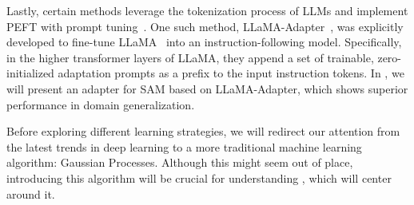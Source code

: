 Lastly, certain methods leverage the tokenization process of LLMs and implement PEFT with prompt tuning~. One such method, LLaMA-Adapter~, was explicitly developed to fine-tune LLaMA~ into an instruction-following model. Specifically, in the higher transformer layers of LLaMA, they append a set of trainable, zero-initialized adaptation prompts as a prefix to the input instruction tokens. In , we will present an adapter for SAM based on LLaMA-Adapter, which shows superior performance in domain generalization.

\sectionlinenew

Before exploring different learning strategies, we will redirect our attention from the latest trends in deep learning to a more traditional machine learning algorithm: Gaussian Processes. Although this might seem out of place, introducing this algorithm will be crucial for understanding , which will center around it.

